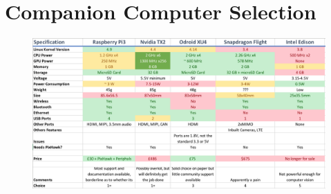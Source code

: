 \documentclass[11pt]{article}
\begin{document}
\section{Companion Computer Selection} \label{app:cc_selection}
\begin{figure}[h]
    \includegraphics[width=\linewidth]{companion_computer_comparison}
    \caption{}
\end{figure}
\end{document}

